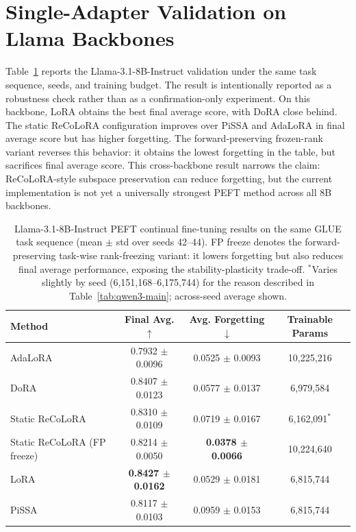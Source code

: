 \documentclass[11pt]{article}
\begin{document}
\section{Single-Adapter Validation on Llama Backbones}\label{app:llama}
Table~\ref{tab:llama-main} reports the Llama-3.1-8B-Instruct validation under the same task sequence, seeds, and training budget. The result is intentionally reported as a robustness check rather than as a confirmation-only experiment. On this backbone, LoRA obtains the best final average score, with DoRA close behind. The static ReCoLoRA configuration improves over PiSSA and AdaLoRA in final average score but has higher forgetting. The forward-preserving frozen-rank variant reverses this behavior: it obtains the lowest forgetting in the table, but sacrifices final average score. This cross-backbone result narrows the claim: ReCoLoRA-style subspace preservation can reduce forgetting, but the current implementation is not yet a universally strongest PEFT method across all 8B backbones.

\begin{table}[t]
\centering
\begin{tabular}{lccc}
\toprule
Method & Final Avg. $\uparrow$ & Avg. Forgetting $\downarrow$ & Trainable Params \\
\midrule
AdaLoRA & 0.7932 $\pm$ 0.0096 & 0.0525 $\pm$ 0.0093 & 10,225,216 \\
DoRA & 0.8407 $\pm$ 0.0123 & 0.0577 $\pm$ 0.0137 & 6,979,584 \\
Static ReCoLoRA & 0.8310 $\pm$ 0.0109 & 0.0719 $\pm$ 0.0167 & 6,162,091$^{*}$ \\
Static ReCoLoRA (FP freeze) & 0.8214 $\pm$ 0.0050 & \textbf{0.0378 $\pm$ 0.0066} & 10,224,640 \\
LoRA & \textbf{0.8427 $\pm$ 0.0162} & 0.0529 $\pm$ 0.0181 & 6,815,744 \\
PiSSA & 0.8117 $\pm$ 0.0103 & 0.0959 $\pm$ 0.0153 & 6,815,744 \\
\bottomrule
\end{tabular}
\caption{Llama-3.1-8B-Instruct PEFT continual fine-tuning results on the same GLUE task sequence (mean $\pm$ std over seeds 42--44). FP freeze denotes the forward-preserving task-wise rank-freezing variant: it lowers forgetting but also reduces final average performance, exposing the stability-plasticity trade-off. $^{*}$Varies slightly by seed (6,151,168--6,175,744) for the reason described in Table~\ref{tab:qwen3-main}; across-seed average shown.}
\label{tab:llama-main}
\end{table}
\end{document}
